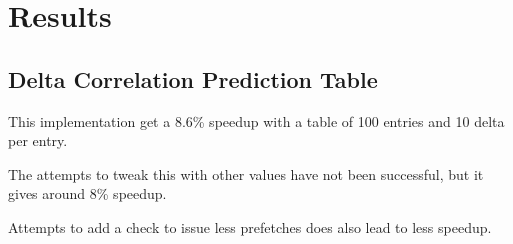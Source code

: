 \chapter{Results}
\section{Delta Correlation Prediction Table}
This implementation get a 8.6\% speedup with a table of 100 entries and 10 delta per entry.

The attempts to tweak this with other values have not been successful, but it gives around 8\% speedup.

Attempts to add a check to issue less prefetches does also lead to less speedup.


